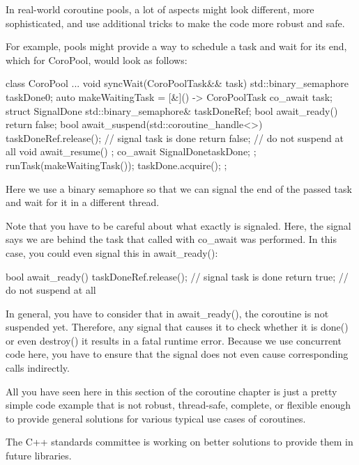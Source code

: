 
In real-world coroutine pools, a lot of aspects might look different, more sophisticated, and use additional tricks to make the code more robust and safe.

For example, pools might provide a way to schedule a task and wait for its end, which for CoroPool, would look as follows:

\begin{cpp}
class CoroPool
{
	...
	void syncWait(CoroPoolTask&& task) {
		std::binary_semaphore taskDone{0};
		auto makeWaitingTask = [&]() -> CoroPoolTask {
			co_await task;
			struct SignalDone {
				std::binary_semaphore& taskDoneRef;
				bool await_ready() { return false; }
				bool await_suspend(std::coroutine_handle<>) {
					taskDoneRef.release(); // signal task is done
					return false; // do not suspend at all
				}
				void await_resume() { }
			};
			co_await SignalDone{taskDone};
		};
		runTask(makeWaitingTask());
		taskDone.acquire();
	}
};
\end{cpp}

Here we use a binary semaphore so that we can signal the end of the passed task and wait for it in a different thread.

Note that you have to be careful about what exactly is signaled. Here, the signal says we are behind the task that called with co\_await was performed. In this case, you could even signal this in await\_ready():

\begin{cpp}
bool await_ready() {
	taskDoneRef.release(); // signal task is done
	return true; // do not suspend at all
}
\end{cpp}

In general, you have to consider that in await\_ready(), the coroutine is not suspended yet. Therefore, any signal that causes it to check whether it is done() or even destroy() it results in a fatal runtime error. Because we use concurrent code here, you have to ensure that the signal does not even cause corresponding calls indirectly.


All you have seen here in this section of the coroutine chapter is just a pretty simple code example that is not robust, thread-safe, complete, or flexible enough to provide general solutions for various typical use cases of coroutines.

The C++ standards committee is working on better solutions to provide them in future libraries.

